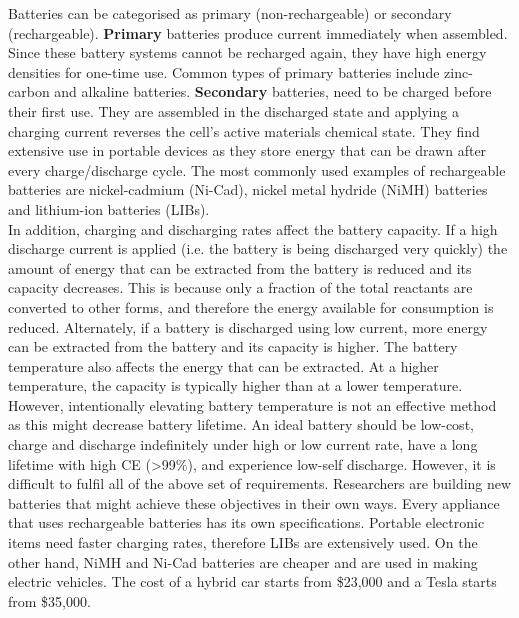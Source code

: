 Batteries can be categorised as primary (non-rechargeable) or secondary (rechargeable). \textbf{Primary} batteries produce current immediately when assembled. Since these battery systems cannot be recharged again, they have high energy densities for one-time use. Common types of primary batteries include zinc-carbon and alkaline batteries. 
\textbf{Secondary} batteries, need to be charged before their first use. They are assembled in the discharged state and applying a charging current reverses the cell's active materials chemical state. They find extensive use in portable devices as they store energy that can be drawn after every charge/discharge cycle. The most commonly used examples of rechargeable batteries are nickel-cadmium (Ni-Cad), nickel metal hydride (NiMH) batteries and lithium-ion batteries (LIBs). \\  
In addition, charging and discharging rates affect the battery capacity. If a high discharge current is applied (i.e. the battery is being discharged very quickly) the amount of energy that can be extracted from the battery is reduced and its capacity decreases. This is because only a fraction of the total reactants are converted to other forms, and therefore the energy available for consumption is reduced. Alternately, if a battery is discharged using low current, more energy can be extracted from the battery and its capacity is higher. The battery temperature also affects the energy that can be extracted. At a higher temperature, the capacity is typically higher than at a lower temperature. However, intentionally elevating battery temperature is not an effective method as this might decrease battery lifetime\cite{leng_effect_2015, ma_temperature_2018}. 
An ideal battery should be low-cost, charge and discharge indefinitely under high or low current rate, have a long lifetime with high CE (>99\%), and experience low-self discharge. However, it is difficult to fulfil all of the above set of requirements. Researchers are building new batteries that might achieve these objectives in their own ways\cite{slater_sodium-ion_2013,jian_carbon_2015,aurbach_prototype_2000,lin_ultrafast_2015}. Every appliance that uses rechargeable batteries has its own specifications. Portable electronic items need faster charging rates, therefore LIBs are extensively used. On the other hand, NiMH and Ni-Cad batteries are cheaper and are used in making electric vehicles. The cost of a hybrid car starts from \$23,000 and a Tesla starts from \$35,000. \\

